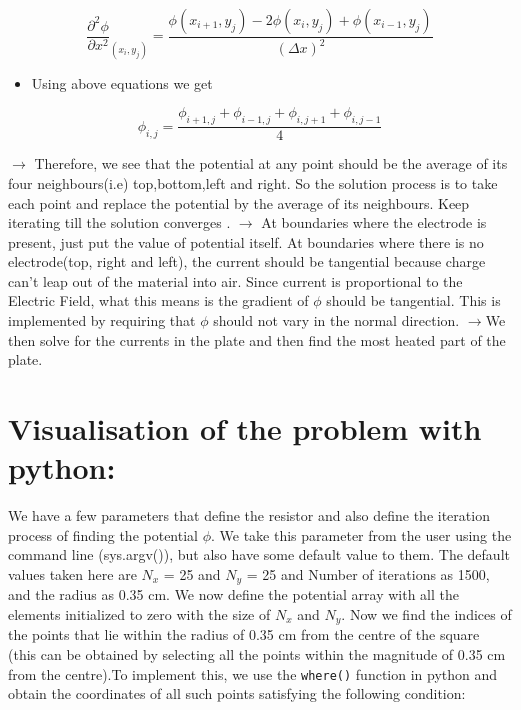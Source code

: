 \documentclass{article}
\begin{document}
    \begin{equation}
    \frac{\partial^{2} \phi}{\partial x^{2}}_{(x_i,y_j)} = \frac{\phi(x_{i+1},y_j) -2\phi(x_i,y_j)+ \phi(x_{i-1},y_j)}{(\Delta x)^{2}}
     \end{equation}
    
    \begin{itemize}
    \item
      Using above equations we get
    \end{itemize}
    
    \begin{equation}
            \phi_{i,j} = \frac{\phi_{i+1,j} + \phi_{i-1,j} + \phi_{i,j+1} + \phi_{i,j-1}}{4} 
    \end{equation}
    
    
      $\rightarrow$ Therefore, we see that the potential at any point should be the average of its
      four neighbours(i.e) top,bottom,left and right. So the solution process is to take each
      point and replace the potential by the average of its neighbours. Keep
      iterating till the solution converges .\newline
      $\rightarrow$ At boundaries where the electrode is present, just put the value of
      potential itself. At boundaries where there is no electrode(top, right and left), the
      current should be tangential because charge can't leap out of the
      material into air. Since current is proportional to the Electric
      Field, what this means is the gradient of \(\phi\) should be
      tangential. This is implemented by requiring that \(\phi\) should not
      vary in the normal direction.\newline
      $\rightarrow$We then solve for the currents in the plate and then find the most heated part of the plate.
      
  
  \section{Visualisation of the problem with python:}\label{visualisation}


We have a few parameters that define the resistor and also define the iteration process of finding the potential \(\phi\). We take this parameter from the user
using the command line (sys.argv()), but also have some default value to
them. The default values taken here are $N_x$ = 25 and $N_y$ = 25 and Number
of iterations as 1500, and the radius as 0.35 cm.\newline
We now define the potential array with all the elements initialized to
zero with the size of $N_x$ and $N_y$. \newline Now we find the indices of the points
that lie within the radius of 0.35 cm from the centre of the square (this can
be obtained by selecting all the points within the magnitude of 0.35 cm from
the centre).\newline To implement this, we use the \texttt{where()} function in python and
obtain the coordinates of all such points satisfying the following condition:
\end{document}

